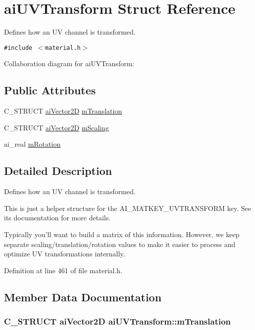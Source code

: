 \hypertarget{structai_u_v_transform}{
\section{aiUVTransform Struct Reference}
\label{structai_u_v_transform}
}
Defines how an UV channel is transformed.  


{\tt \#include $<$material.h$>$}

Collaboration diagram for aiUVTransform:\subsection*{Public Attributes}
\begin{CompactItemize}
\item 
C\_\-STRUCT \hyperlink{structai_vector2_d}{aiVector2D} \hyperlink{structai_u_v_transform_8c7f35959aa342bf0cef670246fbb813}{mTranslation}
\item 
C\_\-STRUCT \hyperlink{structai_vector2_d}{aiVector2D} \hyperlink{structai_u_v_transform_89429a027cbf914e7212e48149a957c8}{mScaling}
\item 
ai\_\-real \hyperlink{structai_u_v_transform_157005aadfdd145a56c7831c7b24f1ea}{mRotation}
\end{CompactItemize}


\subsection{Detailed Description}
Defines how an UV channel is transformed. 

This is just a helper structure for the AI\_\-MATKEY\_\-UVTRANSFORM key. See its documentation for more details.

Typically you'll want to build a matrix of this information. However, we keep separate scaling/translation/rotation values to make it easier to process and optimize UV transformations internally. 

Definition at line 461 of file material.h.

\subsection{Member Data Documentation}
\hypertarget{structai_u_v_transform_8c7f35959aa342bf0cef670246fbb813}{
\subsubsection[mTranslation]{\setlength{\rightskip}{0pt plus 5cm}C\_\-STRUCT {\bf aiVector2D} {\bf aiUVTransform::mTranslation}}}
\label{structai_u_v_transform_8c7f35959aa342bf0cef670246fbb813}


